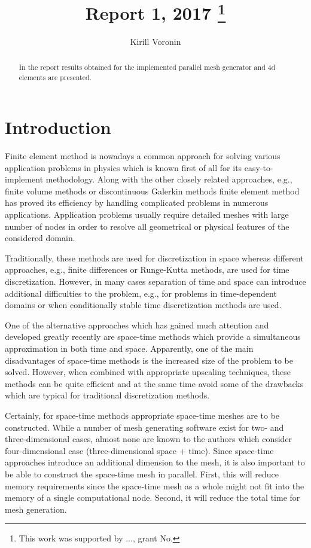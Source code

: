 \documentclass[12pt]{article}
\title{Report 1, 2017 \footnote{This work was supported by ..., grant No. }}
\author{Kirill Voronin}
\date{}
\begin{document}
\maketitle

\begin{abstract}
In the report results obtained for the implemented parallel mesh generator and 4d elements are presented.
\end{abstract}

\section*{Introduction}

Finite element method is nowadays a common approach for solving various application problems in physics which is known first of all for its easy-to-implement methodology. Along with the other closely related approaches, e.g., finite volume methods or discontinuous Galerkin methods finite element method has proved its efficiency by handling complicated problems in numerous applications. Application problems usually require detailed meshes with large number of nodes in order to resolve all geometrical or physical features of the considered domain.

Traditionally, these methods are used for discretization in space whereas different approaches, e.g., finite differences or Runge-Kutta methods, are used for time discretization.
However, in many cases separation of time and space can introduce additional difficulties to the problem, e.g., for problems in time-dependent domains or when conditionally stable time discretization methods are used.  

One of the alternative approaches which has gained much attention and developed greatly recently are space-time methods which provide a simultaneous approximation in both time and space. Apparently, one of the main disadvantages of space-time methods is the increased size of the problem to be solved. However, when combined with appropriate upscaling techniques, these methods can be quite efficient and at the same time avoid some of the drawbacks which are typical for traditional discretization methods.

Certainly, for space-time methods appropriate space-time meshes are to be constructed. While a number of mesh generating software exist for two- and three-dimensional cases, almost none are known to the authors which consider four-dimensional case (three-dimensional space + time). Since space-time approaches introduce an additional dimension to the mesh, it is also important to be able to construct the space-time mesh in parallel. First, this will reduce memory requirements since the space-time mesh as a whole might not fit into the memory of a single computational node. Second, it will reduce the total time for mesh generation.
\end{document}
